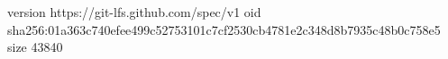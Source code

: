 version https://git-lfs.github.com/spec/v1
oid sha256:01a363c740efee499c52753101c7cf2530cb4781e2c348d8b7935c48b0c758e5
size 43840
